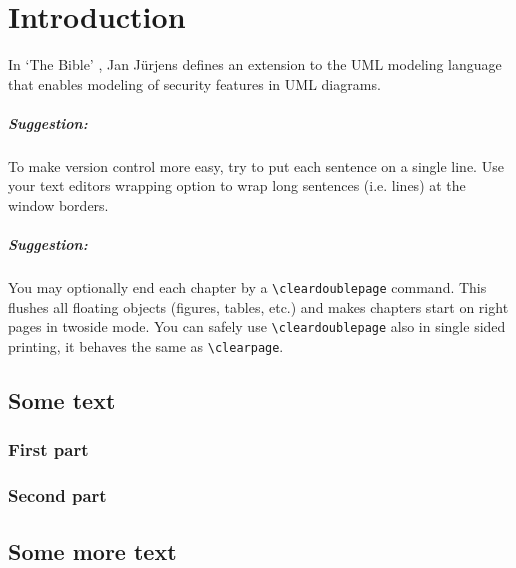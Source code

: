 
\chapter{Introduction}

In `The Bible' \cite{Juerjens2005SSD}, Jan Jürjens defines an extension to the UML modeling language that enables modeling of security features in UML diagrams.

\paragraph{Suggestion:}
To make version control more easy, try to put each sentence on a single line.
Use your text editors wrapping option to wrap long sentences (i.e. lines) at the window borders.

\paragraph{Suggestion:}
You may optionally end each chapter by a \verb+\cleardoublepage+ command.
This flushes all floating objects (figures, tables, etc.) and makes chapters start on right pages in twoside mode.
You can safely use \verb+\cleardoublepage+ also in single sided printing, it behaves the same as \verb+\clearpage+.

\section{Some text}

\subsection{First part}

\lipsum[1-1]

\subsection{Second part}

\lipsum[2-3]

\section{Some more text}

\lipsum[4-7]

\cleardoublepage
